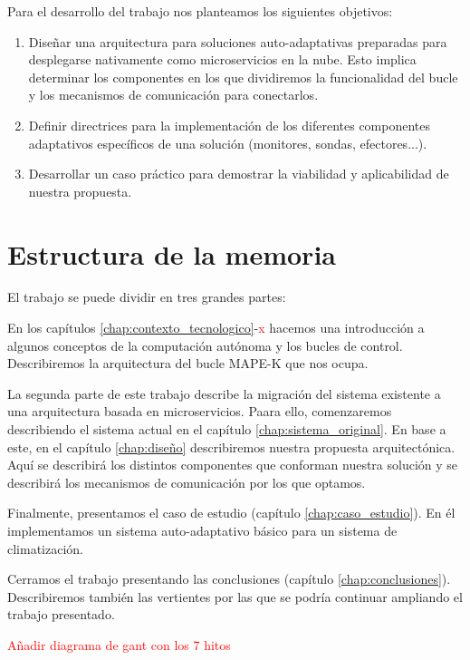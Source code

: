 Para el desarrollo del trabajo nos planteamos los siguientes objetivos:

\begin{enumerate}
  \item Diseñar una arquitectura para soluciones auto-adaptativas preparadas para desplegarse nativamente como microservicios en la nube. Esto implica determinar los componentes en los que dividiremos la funcionalidad del bucle y los mecanismos de comunicación para conectarlos.

  \item Definir directrices para la implementación de los diferentes componentes adaptativos específicos de una solución (monitores, sondas, efectores...).

  \item Desarrollar un caso práctico para demostrar la viabilidad y aplicabilidad de nuestra propuesta.
\end{enumerate}

\section{Estructura de la memoria}

El trabajo se puede dividir en tres grandes partes:

En los capítulos \ref{chap:contexto_tecnologico}-\textcolor{red}{x} hacemos una introducción a algunos conceptos de la computación autónoma y los bucles de control. Describiremos la arquitectura del bucle MAPE-K que nos ocupa.

La segunda parte de este trabajo describe la migración del sistema existente a una arquitectura basada en microservicios. Paara ello, comenzaremos describiendo el sistema actual en el capítulo \ref{chap:sistema_original}. En base a este, en el capítulo \ref{chap:diseño} describiremos nuestra propuesta arquitectónica. Aquí se describirá los distintos componentes que conforman nuestra solución y se describirá los mecanismos de comunicación por los que optamos.

Finalmente, presentamos el caso de estudio (capítulo \ref{chap:caso_estudio}). En él implementamos un sistema auto-adaptativo básico para un sistema de climatización.

Cerramos el trabajo presentando las conclusiones (capítulo \ref{chap:conclusiones}). Describiremos también las vertientes por las que se podría continuar ampliando el trabajo presentado.



\textcolor{red}{Añadir diagrama de gant con los 7 hitos}
